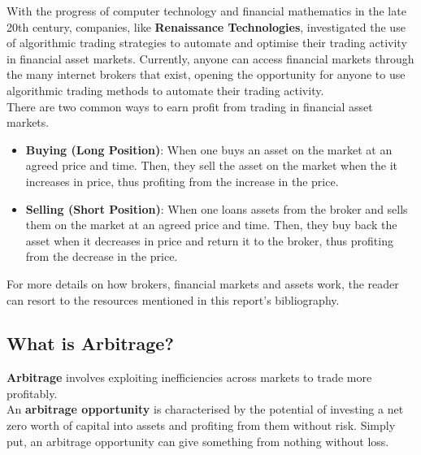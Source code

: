 \documentclass[11pt]{article}
\begin{document}
With the progress of computer technology and financial mathematics in the late 20th century, companies, like \textbf{Renaissance Technologies}, investigated the use of algorithmic trading strategies to automate and optimise their trading activity in financial asset markets.
\nolinebreak
Currently, anyone can access financial markets through the many internet brokers that exist, opening the opportunity for anyone to use algorithmic trading methods to automate their trading activity.\\

There are two common ways to earn profit from trading in financial asset markets.

\begin{itemize}

    \item \textbf{Buying (Long Position)}: When one buys an asset on the market at an agreed price and time. Then, they sell the asset on the market when the it increases in price, thus profiting from the increase in the price.
    
    \item \textbf{Selling (Short Position)}: When one loans assets from the broker and sells them on the market at an agreed price and time. Then, they buy back the asset when it decreases in price and return it to the broker, thus profiting from the decrease in the price.
    
\end{itemize}

For more details on how brokers, financial markets and assets work, the reader can resort to the resources mentioned in this report's bibliography.

\subsection{What is Arbitrage?}

\textbf{Arbitrage} involves exploiting inefficiencies across markets to trade more profitably.\\

An \textbf{arbitrage opportunity} is characterised by the potential of investing a net zero worth of capital into assets and profiting from them without risk.
\nolinebreak
Simply put, an arbitrage opportunity can give something from nothing without loss.\\
\end{document}
